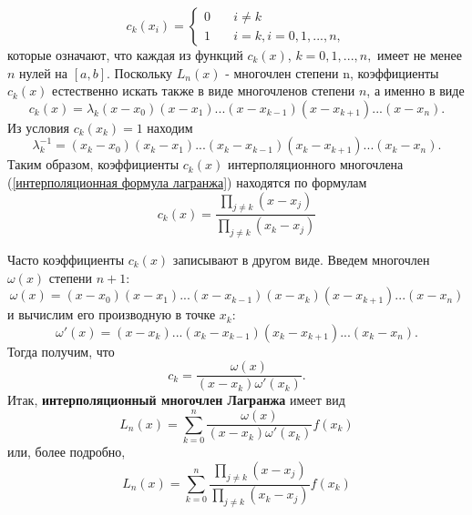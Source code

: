 \begin{equation*}
    c_k(x_i) =
    \begin{cases}
    0       & \quad i \neq k\\
    1  & \quad i = k, i =0,1,...,n,
  \end{cases}
\end{equation*}
которые означают, что каждая из функций $c_k(x)$, $k=0,1,...,n,$ имеет не менее $n$ нулей на $[a,b]$. Поскольку $L_n(x)$ - многочлен степени n, коэффициенты $c_k(x)$ естественно искать также в виде многочленов степени $n$, а именно в виде
\begin{equation*}
    c_k(x) = \lambda_k(x-x_0)(x-x_1)...(x-x_{k-1})(x-x_{k+1})...(x-x_n).
\end{equation*}
Из условия $c_k(x_k)=1$ находим
\begin{equation*}
    \lambda_k^{-1}=(x_k-x_0)(x_k-x_1)...(x_k-x_{k-1})(x_k-x_{k+1})...(x_k-x_n).
\end{equation*}
Таким образом, коэффициенты $c_k(x)$ интерполяционного многочлена (\ref{интерполяционная формула лагранжа}) находятся по формулам
\begin{equation*}
    c_k(x) = \frac{\displaystyle \prod_{j \neq k}(x-x_j)}{\displaystyle \prod_{j \neq k}(x_k-x_j)}
\end{equation*}

Часто коэффициенты $c_k(x)$ записывают в другом виде. Введем многочлен $\omega(x)$ степени $n+1$:
\begin{equation*}
    \omega(x) = (x-x_0)(x-x_1)...(x-x_{k-1})(x-x_k)(x-x_{k+1})...(x-x_n)
\end{equation*}
и вычислим его производную в точке $x_k$:
\begin{equation*}
    \omega '(x) = (x-x_k)...(x_k - x_{k-1})(x_k-x_{k+1})...(x_k-x_n).
\end{equation*}
Тогда получим, что
\begin{equation*}
    c_k = \frac{\omega (x)}{(x-x_k)\omega ' (x_k)}.
\end{equation*}
Итак, \textbf{интерполяционный многочлен Лагранжа} имеет вид
\begin{equation*}
    L_n(x) = \displaystyle \sum_{k=0}^{n} \frac{\omega(x)}{(x-x_k)\omega ' (x_k)} f(x_k)
\end{equation*}
или, более подробно,
\begin{equation*}
    L_n(x) = \displaystyle \sum_{k=0}^{n} \frac{\displaystyle \prod_{j \neq k}(x-x_j)}{\displaystyle \prod_{j \neq k}(x_k-x_j)} f(x_k)
\end{equation*}

